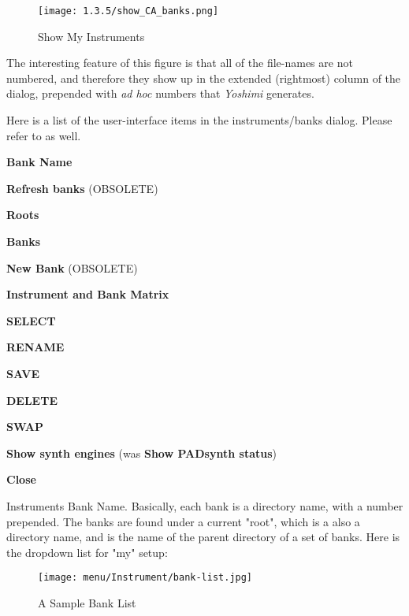 
\begin{figure}[H]
   \centering 
   \texttt{[image: 1.3.5/show\_CA\_banks.png]}
   \caption[Show CA's Instruments]{Show My Instruments}
   \label{fig:show_ca_bank}
\end{figure}

   The interesting feature of this figure is that
   all of the file-names are not numbered, and therefore they show up in the
   extended (rightmost) column of the dialog, prepended with
   \textsl{ad hoc} numbers that \textsl{Yoshimi} generates.

   Here is a list of the user-interface items in the instruments/banks dialog.
   Please refer to 
    as well.

   \begin{enumber}
      \item \textbf{Bank Name}
      \item \textbf{Refresh banks} (OBSOLETE)
      \item \textbf{Roots}
      \item \textbf{Banks}
      \item \textbf{New Bank} (OBSOLETE)
      \item \textbf{Instrument and Bank Matrix}
      \item \textbf{SELECT}
      \item \textbf{RENAME}
      \item \textbf{SAVE}
      \item \textbf{DELETE}
      \item \textbf{SWAP}
      \item \textbf{Show synth engines}
         (was \textbf{Show PADsynth status})
      \item \textbf{Close}
   \end{enumber}

   \setcounter{ItemCounter}{0}      %

   Instruments Bank Name.
   Basically, each bank is a directory name, with a number prepended.
   The banks are found under a current "root", which is a also a directory
   name, and is the name of the parent directory of a set of banks.
   Here is the dropdown list for "my" setup:

\begin{figure}[H]
   \centering 
   \texttt{[image: menu/Instrument/bank-list.jpg]}
   \caption[A Sample Bank List]{A Sample Bank List}
   \label{fig:bank_list}
\end{figure}

